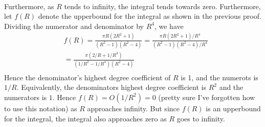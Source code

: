 \documentclass{article}
\theoremstyle{definition}
\newcommand{\cs}[1]{\color{blue}{#1}\normalcolor}
\begin{document}
\\

 Furthermore, as $R$ tends to infinity, the integral tends towards zero. Furthermore, let $f(R)$ denote the upperbound for the integral as shown in the previous proof.\\

 Dividing the numerator and denominator by $R^4$,
we have 
$$\begin{array}{cc}
     & f(R) = \frac{\pi R(2R^2 + 1)}{(R^2-1)(R^2-4)} = \frac{\pi R(2R^2 + 1)/R^4}{(R^2-1)(R^2-4)/R^4}  \\
     &  = \frac{\pi(2/R + 1/R^3)}{(1/R^2 - 1/R^4)(R^2 - 4)} \\
\end{array}  $$
Hence the denominator's highest degree coefficient of $R$ is 1, and the numerots is $1/R$. Equivalently, the denominators highest degree coefficient is $R^2$ and the numerators is $1$. Hence $f(R) = O(1/R^2) = 0$ (pretty sure I've forgotten how to use this notation) as $R$ approaches infinity. But since $f(R)$ is an upperbound for the integral, the integral also approaches zero as $R$ goes to infinity.

\cs{The terminology is a bit off -- the coefficient is the number multiplying the $R^2$ (or whatever it may be). The coefficients don't have degrees; the terms do. It's simpler to see the numerator as looking like $(2/R+1/R^2)$ and the denominator like $(1-1/R^2)(1-4/R^2).$ Then as $R\rightarrow \infty,$ the numerator approaches 0 and the denominator approaches 1.}

\cs{5/5}

\cs{10/10}
\end{document}
